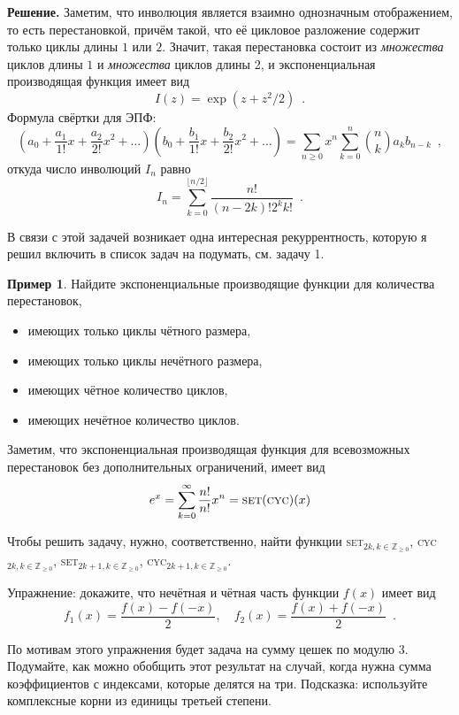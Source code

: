 \documentclass{article}
\theoremstyle{definition}
\newtheorem{example}{Пример}
\begin{document}
\textbf{Решение.} Заметим, что инволюция является взаимно однозначным 
отображением, то есть перестановкой, причём такой, что её цикловое разложение 
содержит только циклы длины \( 1 \) или \( 2 \). Значит, такая перестановка 
состоит из \textit{множества} циклов длины \( 1 \) и \textit{множества} циклов 
длины 2, и экспоненциальная производящая функция имеет вид
\[
	I(z) = \exp \left(
		z + z^2/2
	\right) \enspace .
\]
Формула свёртки для ЭПФ:
\[
	\left(a_0 + \dfrac{a_1}{1!}x + \dfrac{a_2}{2!}x^2 + \ldots\right)
	\left(b_0 + \dfrac{b_1}{1!}x + \dfrac{b_2}{2!}x^2 + \ldots\right)	
= \sum_{n \geq 0} x^n \sum_{k = 0}^{n}{n \choose k} a_{k} b_{n-k} \enspace ,
\]
откуда число инволюций \( I_n \) равно
\[
	I_n = \sum_{k=0}^{\lfloor n/2 \rfloor}\dfrac{n!}{(n-2k)!2^k k!} \enspace .
\]

В связи с этой задачей возникает одна интересная рекуррентность, которую я решил
включить в список задач на подумать, см. задачу 1.

\begin{example}   Найдите экспоненциальные производящие функции для количества 
перестановок,
\begin{itemize}
	\item имеющих только циклы чётного размера,
	\item имеющих только циклы нечётного размера,
	\item имеющих чётное количество циклов,
	\item имеющих нечётное количество циклов.
\end{itemize}     
\end{example}

Заметим, что экспоненциальная производящая функция для всевозможных перестановок
без дополнительных ограничений, имеет вид
\begin{equation*}
    e^x = \sum_{k=0}^{\infty} \dfrac{n!}{n!}x^n =
\text{\textsc{set}}(\text{\textsc{cyc}})(x)
\end{equation*}

Чтобы решить задачу, нужно, соответственно, найти функции
\textsc{set}$_{2k, k \in \mathbb Z_{\geq 0}}$, \textsc{cyc}$_{2k, k \in \mathbb Z_{\geq 0}}$,
\textsc{set}$_{2k + 1, k \in \mathbb Z_{\geq 0}}$, \textsc{cyc}$_{2k + 1, k \in \mathbb
Z_{\geq 0}}$.

Упражнение: докажите, что нечётная и чётная часть функции \( f(x) \) имеет вид
\[
    f_{1}(x) = \dfrac{f(x) - f(-x)}{2}, \quad
    f_{2}(x) = \dfrac{f(x) + f(-x)}{2} \enspace . 
\]

По мотивам этого упражнения будет задача на сумму цешек по модулю 3. Подумайте,
как можно обобщить этот результат на случай, когда нужна сумма коэффициентов с
индексами, которые делятся на три. Подсказка: используйте комплексные корни из
единицы третьей степени.
\end{document}
